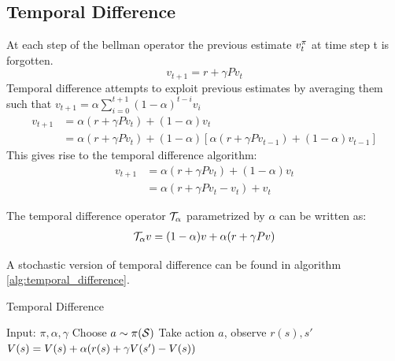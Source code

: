 \subsection{Temporal Difference}
At each step of the bellman operator the previous estimate $v^{\pi}_t$ at time step t is forgotten.
\begin{equation}
    v_{t+1} = r + \gamma P v_{t}
\end{equation}
Temporal difference attempts to exploit previous estimates by averaging them such that $v_{t+1} = \alpha \sum_{i=0}^{t+1} (1-\alpha)^{t-i} v_i$
\begin{equation}
\begin{split}
    v_{t+1} &= \alpha  (r + \gamma P v_{t}) + (1-\alpha) v_{t} \\
    &= \alpha  (r + \gamma P v_{t}) + (1-\alpha) [\alpha (r + \gamma P v_{t-1}) + (1-\alpha) v_{t-1}]
\end{split}
\end{equation}
This gives rise to the temporal difference algorithm:
\begin{equation}
\begin{split}
    v_{t+1} &= \alpha  (r + \gamma P v_{t}) + (1-\alpha) v_{t} \\
    &= \alpha (r + \gamma P v_{t} - v_{t}) + v_{t}
\end{split}
\end{equation}
\begin{definition}
The temporal difference operator $\mathcal{T}_{\alpha}$ parametrized by $\alpha$ can be written as:
\begin{equation}
\begin{split}
    \mathcal{T}_{\alpha} v &= (1-\alpha)v + \alpha(r + \gamma Pv) \\
\end{split}
\end{equation}
\end{definition}

A stochastic version of temporal difference can be found in algorithm \ref{alg:temporal_difference}.\\
\begin{algorithm}[H]
\caption{Temporal Difference}
\begin{algorithmic}[1]
    \STATE Input: $\pi,\alpha,\gamma$
        \STATE Choose $a \sim \pi(\mathcal{S})$
        \STATE Take action $a$, observe $r(s),s'$
        \STATE $V(s) = V(s) + \alpha (r(s) + \gamma V(s')-V(s)) $
    \ENDFOR
\end{algorithmic}
\label{alg:temporal_difference}
\end{algorithm}


